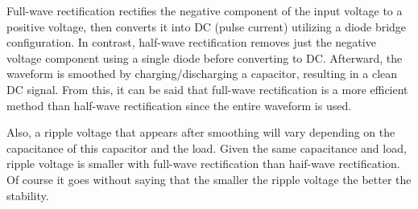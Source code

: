 Full-wave rectification rectifies the negative component of the input voltage to a positive voltage, then converts it into DC (pulse current) utilizing a diode bridge configuration. In contrast, half-wave rectification removes just the negative voltage component using a single diode before converting to DC.
Afterward, the waveform is smoothed by charging/discharging a capacitor, resulting in a clean DC signal.
From this, it can be said that full-wave rectification is a more efficient method than half-wave rectification since the entire waveform is used.

Also, a ripple voltage that appears after smoothing will vary depending on the capacitance of this capacitor and the load. Given the same capacitance and load, ripple voltage is smaller with full-wave rectification than haif-wave rectification. Of course it goes without saying that the smaller the ripple voltage the better the stability.

